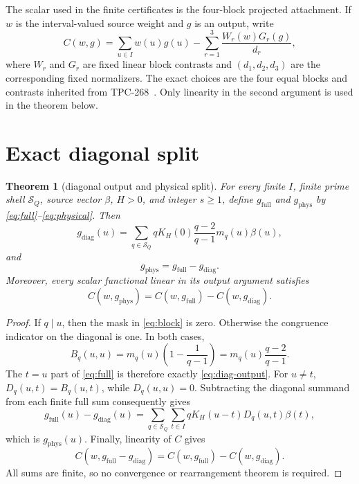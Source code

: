 \documentclass[11pt]{article}
\newtheorem{theorem}{Theorem}
\newcommand{\1}{\mathbf{1}}
\newcommand{\phys}{\mathrm{phys}}
\newcommand{\full}{\mathrm{full}}
\newcommand{\del}{\mathrm{diag}}
\begin{document}
The scalar used in the finite certificates is the four-block projected
attachment.  If $w$ is the interval-valued source weight and $g$ is an output,
write
\begin{equation}
 C(w,g)=\sum_{u\in I}w(u)g(u)
 -\sum_{r=1}^{3}\frac{W_r(w)G_r(g)}{d_r},
 \label{eq:attachment}
\end{equation}
where $W_r$ and $G_r$ are fixed linear block contrasts and
$(d_1,d_2,d_3)$ are the corresponding fixed normalizers.  The exact choices
are the four equal blocks and contrasts inherited from TPC-268~\cite{tpc268}.
Only linearity in the second argument is used in the theorem below.

\section{Exact diagonal split}

\begin{theorem}[diagonal output and physical split]
For every finite $I$, finite prime shell $\mathcal S_Q$, source vector $\beta$,
$H>0$, and integer $s\geq1$, define $g_{\full}$ and $g_{\phys}$ by
\eqref{eq:full}--\eqref{eq:physical}.  Then
\begin{equation}
 g_{\del}(u)=\sum_{q\in\mathcal S_Q}qK_H(0)
       \frac{q-2}{q-1}m_q(u)\beta(u),
 \label{eq:diag-output}
\end{equation}
and
\begin{equation}
 g_{\phys}=g_{\full}-g_{\del}.
 \label{eq:output-split}
\end{equation}
Moreover, every scalar functional linear in its output argument satisfies
\begin{equation}
 C(w,g_{\phys})=C(w,g_{\full})-C(w,g_{\del}).
 \label{eq:scalar-split}
\end{equation}
\end{theorem}

\begin{proof}
If $q\mid u$, then the mask in \eqref{eq:block} is zero.  Otherwise the
congruence indicator on the diagonal is one.  In both cases,
\begin{equation}
 B_q(u,u)=m_q(u)\left(1-\frac1{q-1}\right)
 =m_q(u)\frac{q-2}{q-1}.
 \label{eq:diagonal-entry}
\end{equation}
The $t=u$ part of \eqref{eq:full} is therefore exactly \eqref{eq:diag-output}.
For $u\ne t$, $D_q(u,t)=B_q(u,t)$, while $D_q(u,u)=0$.  Subtracting the
diagonal summand from each finite full sum consequently gives
\begin{equation}
 g_{\full}(u)-g_{\del}(u)
 =\sum_{q\in\mathcal S_Q}\sum_{t\in I}
 qK_H(u-t)D_q(u,t)\beta(t),
\end{equation}
which is $g_{\phys}(u)$.  Finally, linearity of $C$ gives
\begin{equation}
 C(w,g_{\full}-g_{\del})
 =C(w,g_{\full})-C(w,g_{\del}).
\end{equation}
All sums are finite, so no convergence or rearrangement theorem is required.
\end{proof}
\end{document}
